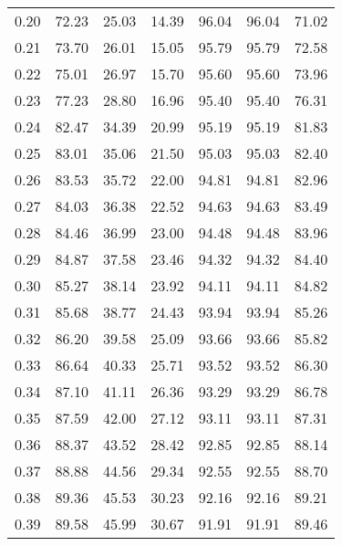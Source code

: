 \begin{tabular}{|c|c|c|c|c|c|c|}
      0.20 &     72.23 &     25.03 &      14.39 &   96.04 &      96.04 &         71.02 \\
      0.21 &     73.70 &     26.01 &      15.05 &   95.79 &      95.79 &         72.58 \\
      0.22 &     75.01 &     26.97 &      15.70 &   95.60 &      95.60 &         73.96 \\
      0.23 &     77.23 &     28.80 &      16.96 &   95.40 &      95.40 &         76.31 \\
      0.24 &     82.47 &     34.39 &      20.99 &   95.19 &      95.19 &         81.83 \\
      0.25 &     83.01 &     35.06 &      21.50 &   95.03 &      95.03 &         82.40 \\
      0.26 &     83.53 &     35.72 &      22.00 &   94.81 &      94.81 &         82.96 \\
      0.27 &     84.03 &     36.38 &      22.52 &   94.63 &      94.63 &         83.49 \\
      0.28 &     84.46 &     36.99 &      23.00 &   94.48 &      94.48 &         83.96 \\
      0.29 &     84.87 &     37.58 &      23.46 &   94.32 &      94.32 &         84.40 \\
      0.30 &     85.27 &     38.14 &      23.92 &   94.11 &      94.11 &         84.82 \\
      0.31 &     85.68 &     38.77 &      24.43 &   93.94 &      93.94 &         85.26 \\
      0.32 &     86.20 &     39.58 &      25.09 &   93.66 &      93.66 &         85.82 \\
      0.33 &     86.64 &     40.33 &      25.71 &   93.52 &      93.52 &         86.30 \\
      0.34 &     87.10 &     41.11 &      26.36 &   93.29 &      93.29 &         86.78 \\
      0.35 &     87.59 &     42.00 &      27.12 &   93.11 &      93.11 &         87.31 \\
      0.36 &     88.37 &     43.52 &      28.42 &   92.85 &      92.85 &         88.14 \\
      0.37 &     88.88 &     44.56 &      29.34 &   92.55 &      92.55 &         88.70 \\
      0.38 &     89.36 &     45.53 &      30.23 &   92.16 &      92.16 &         89.21 \\
      0.39 &     89.58 &     45.99 &      30.67 &   91.91 &      91.91 &         89.46 \\

\end{tabular}
